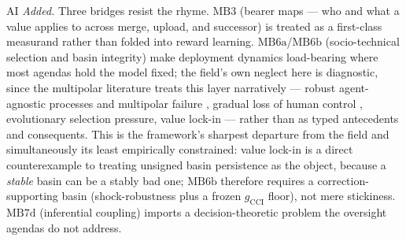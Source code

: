 \begin{authbar}{AI}
\emph{Added.} Three bridges resist the rhyme.
\(\text{MB3}\) (bearer maps --- who and what a value applies to across merge, upload, and successor) is treated as a first-class measurand rather than folded into reward learning.
\(\text{MB6a}\)/\(\text{MB6b}\) (socio-technical selection and basin integrity) make deployment dynamics load-bearing where most agendas hold the model fixed; the field's own neglect here is diagnostic, since the multipolar literature treats this layer narratively --- robust agent-agnostic processes and multipolar failure \autocite{critch2021multipolar,critch2020ai}, gradual loss of human control \autocite{kulveit2025gradualdisempowerment,christiano2019failure}, evolutionary selection pressure, value lock-in --- rather than as typed antecedents and consequents.
This is the framework's sharpest departure from the field and simultaneously its least empirically constrained: value lock-in is a direct counterexample to treating unsigned basin persistence as the object, because a \emph{stable} basin can be a stably bad one; \(\text{MB6b}\) therefore requires a correction-supporting basin (shock-robustness plus a frozen \(g_{\mathrm{CCI}}\) floor), not mere stickiness.
\(\text{MB7d}\) (inferential coupling) imports a decision-theoretic problem the oversight agendas do not address.


\end{authbar}
